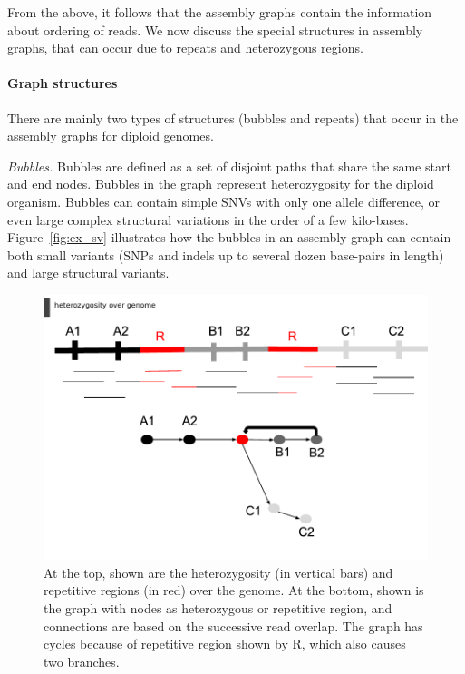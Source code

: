From the above, it follows that the assembly graphs contain the information about ordering of reads. 
We now discuss the special structures in assembly graphs, that can occur due to repeats and heterozygous regions.

\paragraph{Graph structures} There are mainly two types of structures (bubbles and repeats) that occur in the assembly graphs for diploid genomes.

\textit{Bubbles.}
Bubbles are defined as a set of disjoint paths that share the same start and end nodes.
Bubbles in the graph represent heterozygosity for the diploid organism.
Bubbles can contain simple SNVs with only one allele difference, or even large complex structural variations in the order of a few kilo-bases.  
Figure~\ref{fig:ex_sv} illustrates how the bubbles in an assembly graph can contain both small variants (SNPs and indels up to several dozen base-pairs in length) and large structural variants.
\begin{figure}[t!]\centering
\includegraphics[width=\columnwidth]{repeats.pdf}
\caption{At the top, shown are the heterozygosity (in vertical bars) and repetitive regions (in red) over the genome. At the bottom, shown is the graph with nodes as heterozygous or repetitive region, and connections are based on the successive read overlap.
The graph has cycles because of repetitive region shown by R, which also causes two branches.}
\label{fig:repeats}
\end{figure}


